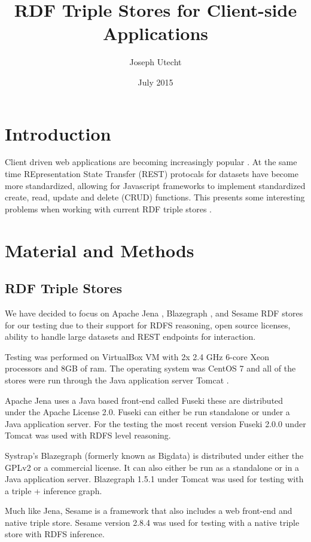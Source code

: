 \documentclass{llncs}
\title{RDF Triple Stores for Client-side Applications}
\author{Joseph Utecht}
\date{July 2015}
\begin{document}
\maketitle
\section{Introduction}

Client driven web applications are becoming increasingly popular \cite{Fielding2000}.  At the same time REpresentation State Transfer (REST) protocals for datasets have become more standardized, allowing for Javascript frameworks to implement standardized create, read, update and delete (CRUD) functions.  This presents some interesting problems when working with current RDF triple stores \cite{Battle2008}.

\section{Material and Methods}
\subsection{RDF Triple Stores}

We have decided to focus on Apache Jena \cite{Jena}, Blazegraph \cite{Blazegraph}, and Sesame \cite{Sesame} RDF stores for our testing due to their support for RDFS reasoning, open source licenses, ability to handle large datasets and REST endpoints for interaction. \cite{Voigt2012}

Testing was performed on VirtualBox VM \cite{Virtualbox} with 2x 2.4 GHz 6-core Xeon processors and 8GB of ram.  The operating system was CentOS 7 \cite{Centos} and all of the stores were run through the Java application server Tomcat \cite{Tomcat}.

Apache Jena uses a Java based front-end called Fuseki these are distributed under the Apache License 2.0.  Fuseki can either be run standalone or under a Java application server.  For the testing the most recent version Fuseki 2.0.0 under Tomcat was used with RDFS level reasoning.

Systrap's Blazegraph (formerly known as Bigdata) is distributed under either the GPLv2 or a commercial license.  It can also either be run as a standalone or in a Java application server.  Blazegraph 1.5.1 under Tomcat was used for testing with a triple + inference graph.

Much like Jena, Sesame is a framework that also includes a web front-end and native triple store.  Sesame version 2.8.4 was used for testing with a native triple store with RDFS inference.
\end{document}
